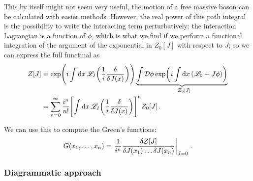 \documentclass[main.tex]{subfiles}
\begin{document}
This by itself might not seem very useful, the motion of a free massive boson can be calculated with easier methods.
However, the real power of this path integral is the possibility to write the interacting term perturbatively: the interaction Lagrangian is a function of \(\phi \), which is what we find if we perform a functional integration of the argument of the exponential in \(Z_0 [J]\) with respect to \(J\); so we can express the full functinal as 
%
\begin{align}
Z[J] &= \exp( i\int \dd{x} \mathscr{L}_I\qty( \frac{1}{i} \fdv{}{J(x)}))
\underbrace{\int \mathcal{D} \phi \exp(i \int \dd{x} \qty( \mathscr{L}_0 + J \phi )) }_{= Z_0 [J]}  \\
&= \sum _{n=0}^{\infty } \frac{i^{n}}{n!} \qty[ \int \dd{x} \mathscr{L}_I\qty(\frac{1}{i} \fdv{}{J(x)})]^{n} Z_0 [J]
\,.
\end{align}

We can use this to compute the Green's functions: 
%
\begin{align}
G(x_1 , \dots , x_n) = \eval{\frac{1}{i^{n}} \frac{ \delta Z[J]}{ \delta J (x_1 ) \dots \delta J(x_n)}}_{J = 0}
\,.
\end{align}

\subsubsection{Diagrammatic approach}

\end{document}
